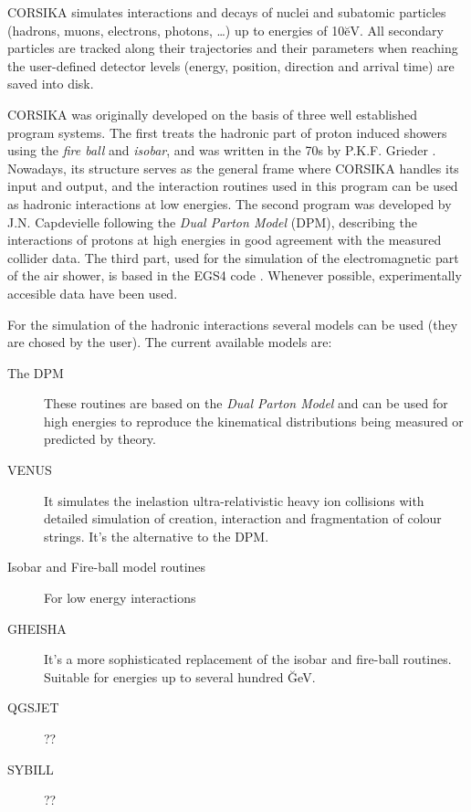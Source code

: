 CORSIKA simulates interactions and decays of nuclei and subatomic
particles (hadrons, muons, electrons, photons, \ldots) up to energies of
10\u{eV}. All secondary particles are tracked along their
trajectories and their parameters when reaching the user-defined
detector levels (energy, position, direction and arrival time) are saved
into disk.

CORSIKA was originally developed on the basis of three well established
program systems. The first treats the hadronic part of proton induced
showers using the \emph{fire ball} and \emph{isobar}, and was written in
the 70s by P.K.F. Grieder \cite{Grieder:1979}. Nowadays, its structure
serves as the general frame where CORSIKA handles its input and output,
and the interaction routines used in this program can be used as
hadronic interactions at low energies. The second program was developed
by J.N. Capdevielle \cite{Capdevielle:1989} following the \emph{Dual
  Parton Model} (DPM)\cite{Capella:1980}, describing the interactions of
protons at high energies in good agreement with the measured collider
data. The third part, used for the simulation of the electromagnetic
part of the air shower, is based in the EGS4 code \cite{EGS4}. Whenever
possible, experimentally accesible data have been used.

For the simulation of the hadronic interactions several models can be
used (they are chosed by the user). The current available models are:

\begin{description}
  
\item[The DPM] These routines are based on the \emph{Dual Parton Model}
  and can be used for high energies to reproduce the kinematical
  distributions being measured or predicted by theory.
  
\item[VENUS] It simulates the inelastion ultra-relativistic heavy ion
  collisions with detailed simulation of creation, interaction and
  fragmentation of colour strings. It's the alternative to the DPM.
  
\item[Isobar and Fire-ball model routines] For low energy interactions
  
\item[GHEISHA] It's a more sophisticated replacement of the isobar and
  fire-ball routines. Suitable for energies up to several hundred
  \u{GeV}.

\item[QGSJET]      ??

\item[SYBILL] ??

\end{description}

